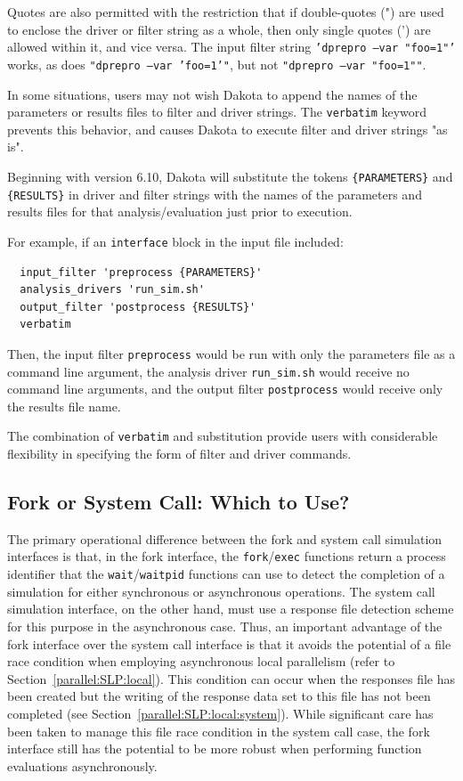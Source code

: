 Quotes are also permitted with the restriction that if double-quotes (") are used to 
enclose the driver or filter string as a whole, then only single quotes (') are allowed 
within it, and vice versa. The input filter string \texttt{'dprepro --var "foo=1"'} 
works, as does \texttt{"dprepro --var 'foo=1'"}, but not \texttt{"dprepro --var "foo=1""}.

In some situations, users may not wish Dakota to append the names of the parameters
or results files to filter and driver strings. The \texttt{verbatim} keyword prevents
this behavior, and causes Dakota to execute filter and driver strings "as is".

Beginning with version 6.10, Dakota will substitute the tokens \texttt{\{PARAMETERS\}} 
and \texttt{\{RESULTS\}} in driver and filter strings with the names of the parameters 
and results files for that analysis/evaluation just prior to execution.

For example, if an \texttt{interface} block in the input file included:

\begin{verbatim}
  input_filter 'preprocess {PARAMETERS}'
  analysis_drivers 'run_sim.sh'
  output_filter 'postprocess {RESULTS}'
  verbatim
\end{verbatim}

Then, the input filter \texttt{preprocess} would be run with only the parameters file 
as a command line argument, the analysis driver \texttt{run\_sim.sh} would receive no 
command line arguments, and the output filter \texttt{postprocess} would receive only 
the results file name.

The combination of \texttt{verbatim} and substitution provide users with considerable
flexibility in specifying the form of filter and driver commands.

\subsection{Fork or System Call: Which to Use?}\label{interfaces:which}

The primary operational difference between the fork and system call
simulation interfaces is that, in the fork interface, the
\texttt{fork}/\texttt{exec} functions return a process identifier
that the \texttt{wait}/\texttt{waitpid} functions can use
to detect the completion of a simulation for either synchronous or
asynchronous operations.  The system call simulation interface, on the
other hand, must use a response file detection scheme for this purpose
in the asynchronous case. Thus, an important advantage of the fork
interface over the system call interface is that it avoids the
potential of a file race condition when employing asynchronous local
parallelism (refer to Section~\ref{parallel:SLP:local}). This condition
can occur when the responses file has been created but the writing of
the response data set to this file has not been completed (see
Section~\ref{parallel:SLP:local:system}). While significant care has been
taken to manage this file race condition in the system call case, the
fork interface still has the potential to be more robust when
performing function evaluations asynchronously.

